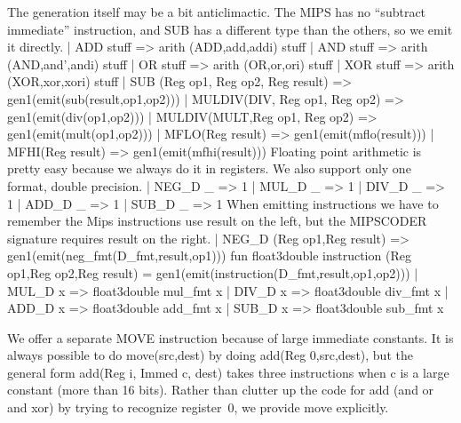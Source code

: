 The generation itself may be a bit anticlimactic.
The MIPS has no ``subtract immediate'' instruction, and \code{}SUB\edoc{} has
a different type than the others, so we emit it directly.
\enddocs
{}
\endmoddef
| ADD stuff => arith (ADD,add,addi) stuff
| AND stuff => arith (AND,and',andi) stuff
| OR  stuff => arith (OR,or,ori) stuff
| XOR stuff => arith (XOR,xor,xori) stuff
| SUB (Reg op1, Reg op2, Reg result) => gen1(emit(sub(result,op1,op2)))
| MULDIV(DIV, Reg op1, Reg op2) => gen1(emit(div(op1,op2)))
| MULDIV(MULT,Reg op1, Reg op2) => gen1(emit(mult(op1,op2)))
| MFLO(Reg result) => gen1(emit(mflo(result)))
| MFHI(Reg result) => gen1(emit(mfhi(result)))
\endcode
{}
Floating point arithmetic is pretty easy because we always do it in
registers.  
We also support only one format, double precision.
\enddocs
{}
\endmoddef
| NEG_D _ => 1
| MUL_D _ => 1
| DIV_D _ => 1
| ADD_D _ => 1
| SUB_D _ => 1
\endcode
{}
When emitting instructions we have to remember the Mips instructions
use result on the left, but the \code{}MIPSCODER\edoc{} signature requires result
on the right.
\enddocs
{}
\endmoddef
| NEG_D (Reg op1,Reg result) => gen1(emit(neg_fmt(D_fmt,result,op1)))
\endcode
{}
\endmoddef
fun float3double instruction (Reg op1,Reg op2,Reg result) =
   gen1(emit(instruction(D_fmt,result,op1,op2)))
\endcode
{}
\endmoddef
| MUL_D x => float3double mul_fmt x
| DIV_D x => float3double div_fmt x
| ADD_D x => float3double add_fmt x
| SUB_D x => float3double sub_fmt x


\endcode
{}
We offer a separate \code{}MOVE\edoc{} instruction because of large immediate
constants.  
It is always possible to do \code{}move(src,dest)\edoc{} by doing 
\code{}add(Reg 0,src,dest)\edoc{}, but the general form \code{}add(Reg i, Immed c, dest)\edoc{}
takes three instructions when \code{}c\edoc{} is a large constant (more than 16 bits).
Rather than clutter up the code for \code{}add\edoc{} (and \code{}or\edoc{} and \code{}xor\edoc{}) by
trying to recognize register~0, we provide \code{}move\edoc{} explicitly.

